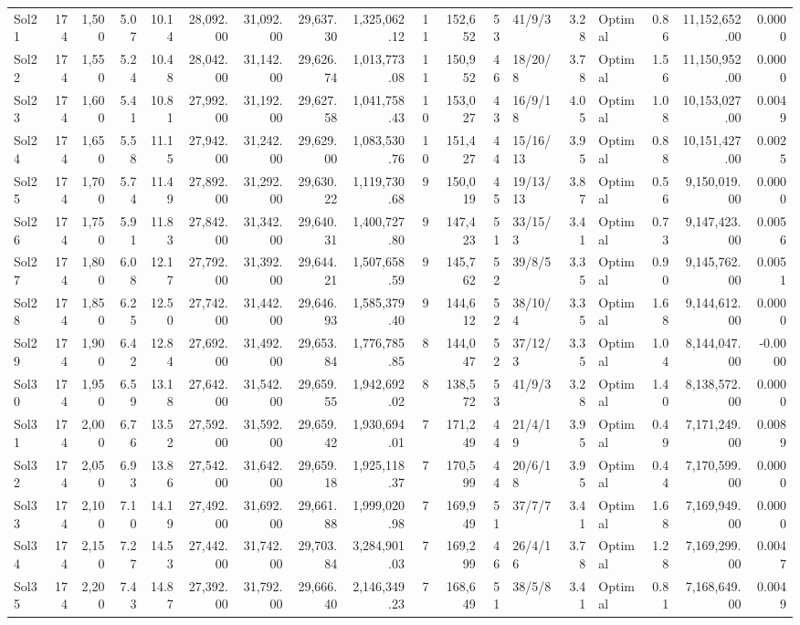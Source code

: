 \documentclass[a4paper]{article}
\begin{document}
{\begin{longtable}{lrrrrrrrrrrrlrlrrr}
Sol21&174&1,500& 5.07&10.14&28,092.00&31,092.00&29,637.30&1,325,062.12&11&152,652&53&41/9/3& 3.28&Optimal& 0.86&11,152,652.00&0.0000\\ 
Sol22&174&1,550& 5.24&10.48&28,042.00&31,142.00&29,626.74&1,013,773.08&11&150,952&46&18/20/8& 3.78&Optimal& 1.56&11,150,952.00&0.0000\\ 
Sol23&174&1,600& 5.41&10.81&27,992.00&31,192.00&29,627.58&1,041,758.43&10&153,027&43&16/9/18& 4.05&Optimal& 1.08&10,153,027.00&0.0049\\ 
Sol24&174&1,650& 5.58&11.15&27,942.00&31,242.00&29,629.00&1,083,530.76&10&151,427&44&15/16/13& 3.95&Optimal& 0.88&10,151,427.00&0.0025\\ 
Sol25&174&1,700& 5.74&11.49&27,892.00&31,292.00&29,630.22&1,119,730.68&9&150,019&45&19/13/13& 3.87&Optimal& 0.56&9,150,019.00&0.0000\\ 
Sol26&174&1,750& 5.91&11.83&27,842.00&31,342.00&29,640.31&1,400,727.80&9&147,423&51&33/15/3& 3.41&Optimal& 0.73&9,147,423.00&0.0056\\ 
Sol27&174&1,800& 6.08&12.17&27,792.00&31,392.00&29,644.21&1,507,658.59&9&145,762&52&39/8/5& 3.35&Optimal& 0.90&9,145,762.00&0.0051\\ 
Sol28&174&1,850& 6.25&12.50&27,742.00&31,442.00&29,646.93&1,585,379.40&9&144,612&52&38/10/4& 3.35&Optimal& 1.68&9,144,612.00&0.0000\\ 
Sol29&174&1,900& 6.42&12.84&27,692.00&31,492.00&29,653.84&1,776,785.85&8&144,047&52&37/12/3& 3.35&Optimal& 1.04&8,144,047.00&-0.0000\\ 
Sol30&174&1,950& 6.59&13.18&27,642.00&31,542.00&29,659.55&1,942,692.02&8&138,572&53&41/9/3& 3.28&Optimal& 1.40&8,138,572.00&0.0000\\ 
Sol31&174&2,000& 6.76&13.52&27,592.00&31,592.00&29,659.42&1,930,694.01&7&171,249&44&21/4/19& 3.95&Optimal& 0.49&7,171,249.00&0.0089\\ 
Sol32&174&2,050& 6.93&13.86&27,542.00&31,642.00&29,659.18&1,925,118.37&7&170,599&44&20/6/18& 3.95&Optimal& 0.44&7,170,599.00&0.0000\\ 
Sol33&174&2,100& 7.10&14.19&27,492.00&31,692.00&29,661.88&1,999,020.98&7&169,949&51&37/7/7& 3.41&Optimal& 1.68&7,169,949.00&0.0000\\ 
Sol34&174&2,150& 7.27&14.53&27,442.00&31,742.00&29,703.84&3,284,901.03&7&169,299&46&26/4/16& 3.78&Optimal& 1.28&7,169,299.00&0.0047\\ 
Sol35&174&2,200& 7.43&14.87&27,392.00&31,792.00&29,666.40&2,146,349.23&7&168,649&51&38/5/8& 3.41&Optimal& 0.81&7,168,649.00&0.0049\\ 

\end{longtable}}
\end{document}
